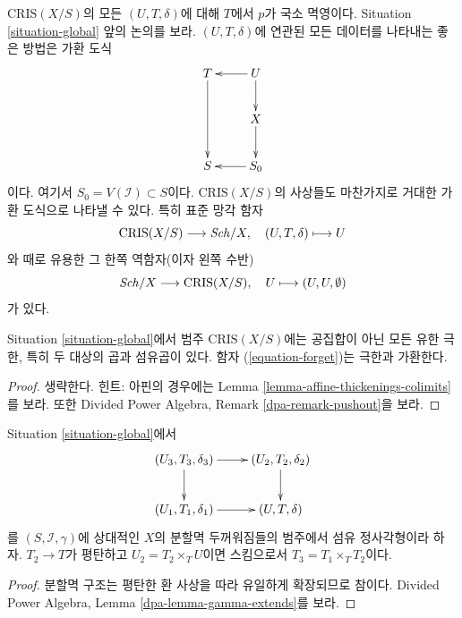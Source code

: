\noindent
$\text{CRIS}(X/S)$의 모든 $(U, T, \delta)$에 대해 $T$에서 $p$가
국소 멱영이다. Situation \ref{situation-global} 앞의 논의를 보라.
$(U, T, \delta)$에 연관된 모든 데이터를 나타내는 좋은 방법은
가환 도식
$$
\xymatrix{
T \ar[dd] & U \ar[l] \ar[d] \\
& X \ar[d] \\
S & S_0 \ar[l]
}
$$
이다. 여기서 $S_0 = V(\mathcal{I}) \subset S$이다.
$\text{CRIS}(X/S)$의 사상들도 마찬가지로 거대한 가환 도식으로
나타낼 수 있다. 특히 표준 망각 함자
\begin{equation}
\label{equation-forget}
\text{CRIS}(X/S) \longrightarrow \mathit{Sch}/X,\quad
(U, T, \delta) \longmapsto U
\end{equation}
와 때로 유용한 그 한쪽 역함자(이자 왼쪽 수반)
\begin{equation}
\label{equation-endow-trivial}
\mathit{Sch}/X \longrightarrow \text{CRIS}(X/S),\quad
U \longmapsto (U, U, \emptyset)
\end{equation}
가 있다.

\begin{lemma}
\label{lemma-divided-power-thickening-fibre-products}
Situation \ref{situation-global}에서 범주 $\text{CRIS}(X/S)$에는
공집합이 아닌 모든 유한 극한, 특히 두 대상의 곱과 섬유곱이 있다.
함자 (\ref{equation-forget})는 극한과 가환한다.
\end{lemma}

\begin{proof}
생략한다. 힌트: 아핀의 경우에는
Lemma \ref{lemma-affine-thickenings-colimits}를 보라. 또한
Divided Power Algebra, Remark \ref{dpa-remark-pushout}을 보라.
\end{proof}

\begin{lemma}
\label{lemma-divided-power-thickening-base-change-flat}
Situation \ref{situation-global}에서
$$
\xymatrix{
(U_3, T_3, \delta_3) \ar[d] \ar[r] & (U_2, T_2, \delta_2) \ar[d] \\
(U_1, T_1, \delta_1) \ar[r] & (U, T, \delta)
}
$$
를 $(S, \mathcal{I}, \gamma)$에 상대적인 $X$의 분할멱 두꺼워짐들의
범주에서 섬유 정사각형이라 하자. $T_2 \to T$가 평탄하고
$U_2 = T_2 \times_T U$이면 스킴으로서
$T_3 = T_1 \times_T T_2$이다.
\end{lemma}

\begin{proof}
분할멱 구조는 평탄한 환 사상을 따라 유일하게 확장되므로 참이다.
Divided Power Algebra, Lemma \ref{dpa-lemma-gamma-extends}를 보라.
\end{proof}

